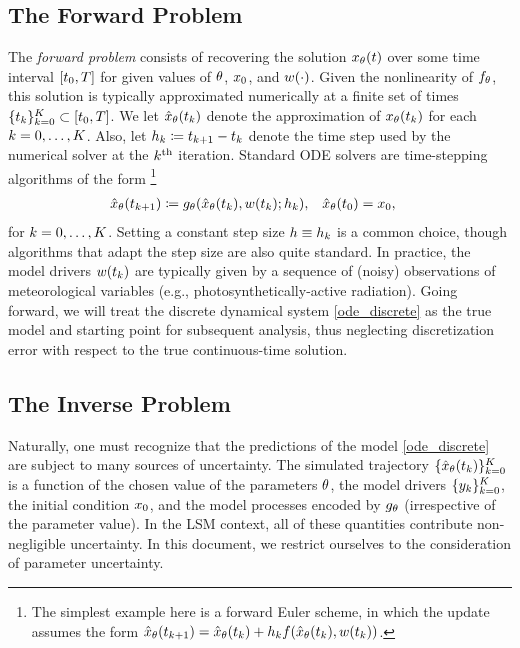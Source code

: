 \documentclass[12pt]{article}
\begin{document}
\subsection{The Forward Problem}
The \textit{forward problem} consists of recovering the solution $\state_{\Par}(\Time)$ over some time interval $[\timeInitState, \timeEnd]$ for given 
values of $\Par$, $\stateInit$, and $\forcing(\cdot)$. Given the nonlinearity of $\funcODE_{\Par}$, this solution is typically approximated 
numerically at a finite set of times $\{\indexTime{\Time}\}_{\timeIdx=\firstTimeIdxState}^{\lastTimeIdx} \subset [\timeInitState, \timeEnd]$. We 
let $\stateApprox_{\Par}(\indexTime{\Time})$ denote the approximation of $\state_{\Par}(\indexTime{\Time})$ for each 
$\timeIdx = \firstTimeIdxState, \dots, \lastTimeIdx$. Also, let $\indexTime{\timeStep} \Def \indexTime[\timeIdx+1]{\Time} - \indexTime{\Time}$ denote the 
time step used by the numerical solver at the $\timeIdx^{\text{th}}$ iteration. Standard ODE solvers are time-stepping algorithms of the 
form 
\footnote{The simplest example here is a forward Euler scheme, in which the update assumes the form 
$\stateApprox_{\Par}(\indexTime[\timeIdx+1]{\Time})
= \stateApprox_{\Par}(\indexTime{\Time}) + \indexTime{\timeStep} \funcODE(\stateApprox_{\Par}(\indexTime{\Time}), \forcing(\indexTime{\Time}))$.}
\begin{align}
&\stateApprox_{\Par}(\indexTime[\timeIdx+1]{\Time}) \Def \fwdOne_{\Par}(\stateApprox_{\Par}(\indexTime{\Time}), \forcing(\indexTime{\Time}); \indexTime{\timeStep}), 
&&\stateApprox_{\Par}(\indexTime[\firstTimeIdxState]{\Time}) = \stateInit, \label{ode_discrete}
\end{align}
for $\timeIdx = \firstTimeIdxState, \dots, \lastTimeIdx$. Setting a constant step size $\timeStep \equiv \indexTime{\timeStep}$ is a common choice, though 
algorithms that adapt the step size are also quite standard. In practice, the model drivers $\forcing(\indexTime{\Time})$
are typically given by a sequence of (noisy) observations of meteorological variables (e.g., photosynthetically-active radiation).
Going forward, we will treat the discrete dynamical system \ref{ode_discrete} as 
the true model and starting point for subsequent analysis, thus neglecting discretization error with respect to the true continuous-time solution. 



\subsection{The Inverse Problem}
Naturally, one must recognize that the predictions of the model \ref{ode_discrete} are subject to many sources of uncertainty. 
The simulated trajectory $\{\stateApprox_{\Par}(\indexTime{\Time})\}_{\timeIdx=\firstTimeIdxState}^{\lastTimeIdx}$ is a function of  
the chosen value of the parameters $\Par$, the model drivers  $\{\indexTime{\obs}\}_{\timeIdx=\firstTimeIdxState}^{\lastTimeIdx}$, the initial condition $\stateInit$, 
and the model processes encoded by $\fwdOne_{\Par}$ (irrespective of the parameter value). In the LSM context, 
all of these quantities contribute non-negligible uncertainty. 
In this document, we restrict ourselves to the consideration of parameter uncertainty. 
\end{document}
